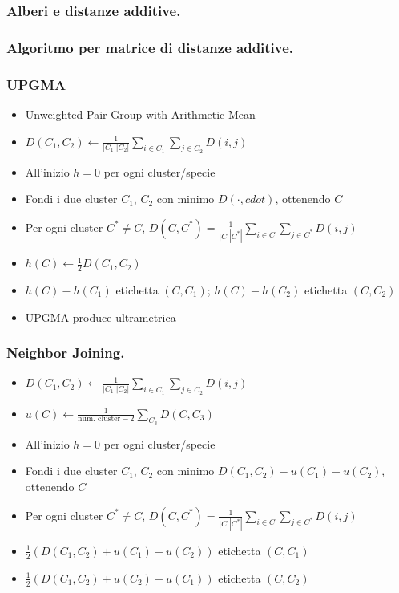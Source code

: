 \begin{frame}[fragile]
\frametitle{Alberi e distanze additive.}
\end{frame}

\begin{frame}[fragile]
\frametitle{Algoritmo per matrice di distanze additive.}
\end{frame}

\begin{frame}[fragile]
  \frametitle{UPGMA}
\begin{itemize}
\item
  Unweighted Pair Group with Arithmetic Mean
\item
  $D(C_{1}, C_{2}) \gets \frac{1}{|C_{1}||C_{2}|}\sum_{i\in C_{1}}\sum_{j\in C_{2}} D(i,j)$
\item
  All'inizio $h=0$ per ogni cluster/specie
\item
  Fondi i due cluster $C_{1}$, $C_{2}$ con minimo $D(\cdot, cdot)$, ottenendo $C$
\item
  Per ogni cluster $C^{*}\neq C$, $D(C, C^{*}) = \frac{1}{|C||C^{*}|}\sum_{i\in C}\sum_{j\in C^{*}} D(i,j)$
\item
  $h(C)\gets \frac{1}{2}D(C_{1}, C_{2})$
\item
  $h(C) - h(C_{1})$ etichetta $(C, C_{1})$; $h(C) - h(C_{2})$ etichetta $(C, C_{2})$
\item
  UPGMA produce ultrametrica
\end{itemize}
\end{frame}

\begin{frame}[fragile]
\frametitle{Neighbor Joining.}
\begin{itemize}
\item
  $D(C_{1}, C_{2}) \gets \frac{1}{|C_{1}||C_{2}|}\sum_{i\in C_{1}}\sum_{j\in C_{2}} D(i,j)$
\item
  $u(C) \gets \frac{1}{\text{num. cluster} - 2} \sum_{C_{3}} D(C,C_{3})$
\item
  All'inizio $h=0$ per ogni cluster/specie
\item
  Fondi i due cluster $C_{1}$, $C_{2}$ con minimo $D(C_{1}, C_{2}) - u(C_{1}) -u(C_{2})$, ottenendo $C$
\item
  Per ogni cluster $C^{*}\neq C$, $D(C, C^{*}) = \frac{1}{|C||C^{*}|}\sum_{i\in C}\sum_{j\in C^{*}} D(i,j)$
\item
  $\frac{1}{2}\left(D(C_{1}, C_{2}) + u(C_{1}) - u(C_{2})\right)$ etichetta $(C, C_{1})$
\item
  $\frac{1}{2}\left(D(C_{1}, C_{2}) + u(C_{2}) - u(C_{1})\right)$ etichetta $(C, C_{2})$
\end{itemize}
\end{frame}

